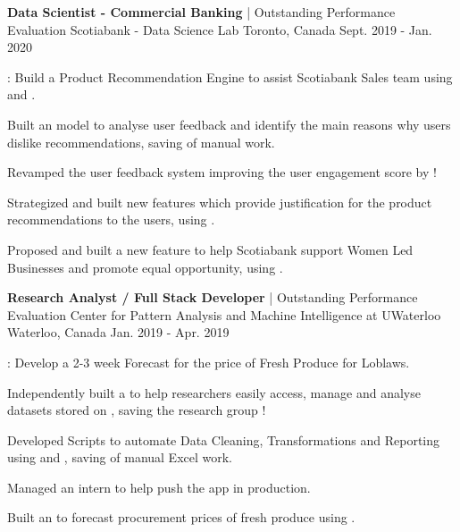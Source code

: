 \begin{cventries}
  \cventry
    {\textbf{Data Scientist - Commercial Banking} | Outstanding Performance Evaluation} %
    {Scotiabank - Data Science Lab} %
    {Toronto, Canada} %
    {Sept. 2019 - Jan. 2020} %
    {
      \begin{cvitems} %
        \item {: Build a Product Recommendation Engine to assist Scotiabank Sales team using  and .}
        \item {Built an  model to analyse user feedback and identify the main reasons why users dislike recommendations, saving  of manual work.}
        \item Revamped the user feedback system improving the user engagement score by !
        \item {Strategized and built new features which provide justification for the product recommendations to the users, using .}
        \item {Proposed and built a new feature to help Scotiabank support Women Led Businesses and promote equal opportunity, using .}
      \end{cvitems}
    }

  \cventry
    {\textbf{Research Analyst / Full Stack Developer} | Outstanding Performance Evaluation} %
    {Center for Pattern Analysis and Machine Intelligence at UWaterloo} %
    {Waterloo, Canada} %
    {Jan. 2019 - Apr. 2019} %
    {
      \begin{cvitems} %
        \item {: Develop a 2-3 week Forecast for the price of Fresh Produce for Loblaws.}
        \item {Independently built a  to help researchers easily access, manage and analyse datasets stored on , saving the research group !}
        \item {Developed  Scripts to automate Data Cleaning, Transformations and Reporting using  and , saving  of manual Excel work.}
        \item {Managed an intern to help push the app in production.}
		\item {Built an  to forecast procurement prices of fresh produce using .}
      \end{cvitems}
    }
\end{cventries}
